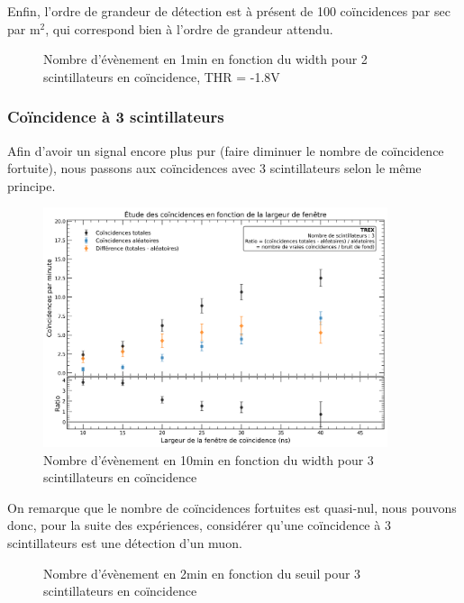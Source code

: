 \documentclass[a4paper,12pt,twoside]{article}
\begin{document}
Enfin, l’ordre de grandeur de détection est à présent de 100 coïncidences par sec par m$^2$, qui correspond bien à l’ordre de grandeur attendu.

\begin{figure}[h!]
    \centering
    \caption{Nombre d’évènement en 1min en fonction du width pour 2 scintillateurs en coïncidence, THR = -1.8V}
\end{figure}

\subsubsection{Coïncidence à 3 scintillateurs}
Afin d’avoir un signal encore plus pur (faire diminuer le nombre de coïncidence fortuite), nous passons aux coïncidences avec 3 scintillateurs selon le même principe.

\begin{figure}[H]
    \centering
    \includegraphics[width=0.9\textwidth]{Images/Coincidences_3_Scintillateurs.png}
    \caption{Nombre d’évènement en 10min en fonction du width pour 3 scintillateurs en coïncidence}
\end{figure}

On remarque que le nombre de coïncidences fortuites est quasi-nul, nous pouvons donc, pour la suite des expériences, considérer qu’une coïncidence à 3 scintillateurs est une détection d’un muon.

\begin{figure}[h!]
    \centering
    \caption{Nombre d’évènement en 2min en fonction du seuil pour 3 scintillateurs en coïncidence}
\end{figure}
\end{document}
